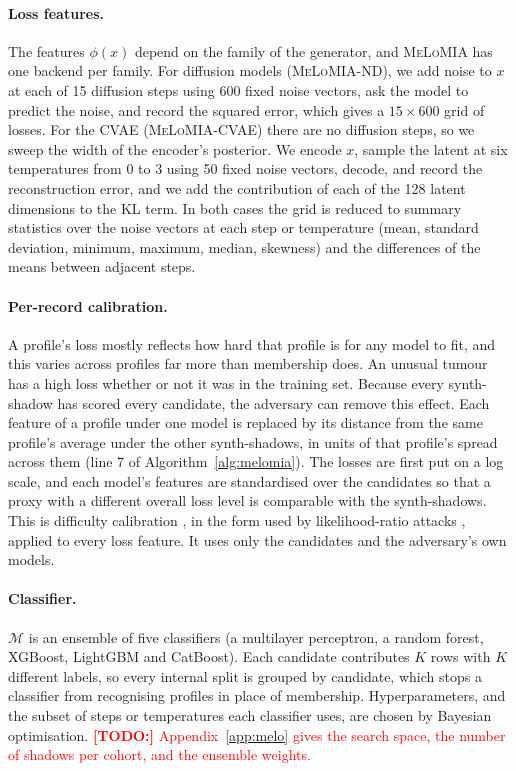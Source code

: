 \documentclass[webpdf,contemporary,large]{oup-authoring-template}
\newif\ifdraft \drafttrue
\newcommand{\annot}[3]{\ifdraft\textcolor{#1}{\textbf{[#2:]} #3}\fi}
\newcommand{\todo}[1]{\annot{red}{TODO}{#1}}
\newcommand{\melo}{\textsc{MeLoMIA}}
\begin{document}
\paragraph{Loss features.}
The features $\phi(x)$ depend on the family of the generator, and \melo{} has one backend per family. For diffusion models (\melo{}-ND), we add noise to $x$ at each of 15 diffusion steps using 600 fixed noise vectors, ask the model to predict the noise, and record the squared error, which gives a $15 \times 600$ grid of losses. For the CVAE (\melo{}-CVAE) there are no diffusion steps, so we sweep the width of the encoder's posterior. We encode $x$, sample the latent at six temperatures from 0 to 3 using 50 fixed noise vectors, decode, and record the reconstruction error, and we add the contribution of each of the 128 latent dimensions to the KL term. In both cases the grid is reduced to summary statistics over the noise vectors at each step or temperature (mean, standard deviation, minimum, maximum, median, skewness) and the differences of the means between adjacent steps.

\paragraph{Per-record calibration.}
A profile's loss mostly reflects how hard that profile is for any model to fit, and this varies across profiles far more than membership does. An unusual tumour has a high loss whether or not it was in the training set. Because every synth-shadow has scored every candidate, the adversary can remove this effect. Each feature of a profile under one model is replaced by its distance from the same profile's average under the other synth-shadows, in units of that profile's spread across them (line 7 of Algorithm~\ref{alg:melomia}). The losses are first put on a log scale, and each model's features are standardised over the candidates so that a proxy with a different overall loss level is comparable with the synth-shadows. This is difficulty calibration \citep{watson2022difficulty}, in the form used by likelihood-ratio attacks \citep{carlini2022membership}, applied to every loss feature. It uses only the candidates and the adversary's own models.

\paragraph{Classifier.}
$\mathcal{M}$ is an ensemble of five classifiers (a multilayer perceptron, a random forest, XGBoost, LightGBM \citep{ke2017lightgbm} and CatBoost). Each candidate contributes $K$ rows with $K$ different labels, so every internal split is grouped by candidate, which stops a classifier from recognising profiles in place of membership. Hyperparameters, and the subset of steps or temperatures each classifier uses, are chosen by Bayesian optimisation.
\todo{Appendix~\ref{app:melo} gives the search space, the number of shadows per cohort, and the ensemble weights.}
\end{document}
